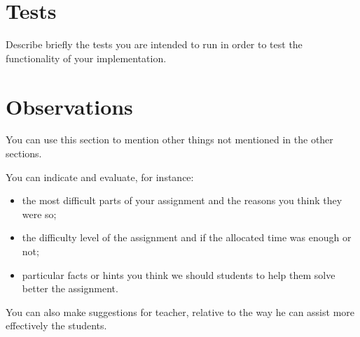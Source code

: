 \section{Tests}

Describe briefly the tests you are intended to run in order to test the functionality of your implementation.

\section{Observations}

You can use this section to mention other things not mentioned in the other sections. 

You can indicate and evaluate, for instance:
\begin{itemize}
	\item the most difficult parts of your assignment and the reasons you think they were so; 
	
	\item the difficulty level of the assignment and if the allocated time was enough or not; 

	\item particular facts or hints you think we should students to help them solve better the assignment.

\end{itemize}

You can also make suggestions for teacher, relative to the way he can assist more effectively the students.

